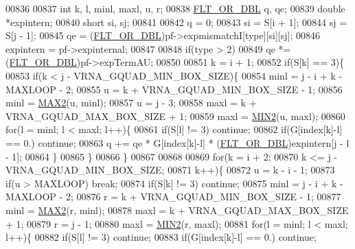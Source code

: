 \begin{DoxyCode}
00836 
00837   \textcolor{keywordtype}{int}         k, l, minl, maxl, u, r;
00838   \hyperlink{group__data__structures_ga31125aeace516926bf7f251f759b6126}{FLT\_OR\_DBL}  q, qe;
00839   \textcolor{keywordtype}{double}      *expintern;
00840   \textcolor{keywordtype}{short}       si, sj;
00841 
00842   q         = 0;
00843   si        = S[i + 1];
00844   sj        = S[j - 1];
00845   qe        = (\hyperlink{group__data__structures_ga31125aeace516926bf7f251f759b6126}{FLT\_OR\_DBL})pf->expmismatchI[type][si][sj];
00846   expintern = pf->expinternal;
00847 
00848   \textcolor{keywordflow}{if}(type > 2)
00849     qe *= (\hyperlink{group__data__structures_ga31125aeace516926bf7f251f759b6126}{FLT\_OR\_DBL})pf->expTermAU;
00850 
00851   k = i + 1;
00852   \textcolor{keywordflow}{if}(S[k] == 3)\{
00853     \textcolor{keywordflow}{if}(k < j - VRNA\_GQUAD\_MIN\_BOX\_SIZE)\{
00854       minl  = j - i + k - MAXLOOP - 2;
00855       u     = k + VRNA\_GQUAD\_MIN\_BOX\_SIZE - 1;
00856       minl  = \hyperlink{group__utils_gadd91367918fadbc8d585940d6206d6d2}{MAX2}(u, minl);
00857       u     = j - 3;
00858       maxl  = k + VRNA\_GQUAD\_MAX\_BOX\_SIZE + 1;
00859       maxl  = \hyperlink{group__utils_ga2dd4a927a7f937f43a90c144d79107d8}{MIN2}(u, maxl);
00860       \textcolor{keywordflow}{for}(l = minl; l < maxl; l++)\{
00861         \textcolor{keywordflow}{if}(S[l] != 3) \textcolor{keywordflow}{continue};
00862         \textcolor{keywordflow}{if}(G[index[k]-l] == 0.) \textcolor{keywordflow}{continue};
00863         q += qe * G[index[k]-l] * (\hyperlink{group__data__structures_ga31125aeace516926bf7f251f759b6126}{FLT\_OR\_DBL})expintern[j - l - 1];
00864       \}
00865     \}
00866   \}
00867 
00868 
00869   \textcolor{keywordflow}{for}(k = i + 2;
00870       k <= j - VRNA\_GQUAD\_MIN\_BOX\_SIZE;
00871       k++)\{
00872     u = k - i - 1;
00873     \textcolor{keywordflow}{if}(u > MAXLOOP) \textcolor{keywordflow}{break};
00874     \textcolor{keywordflow}{if}(S[k] != 3) \textcolor{keywordflow}{continue};
00875     minl  = j - i + k - MAXLOOP - 2;
00876     r     = k + VRNA\_GQUAD\_MIN\_BOX\_SIZE - 1;
00877     minl  = \hyperlink{group__utils_gadd91367918fadbc8d585940d6206d6d2}{MAX2}(r, minl);
00878     maxl  = k + VRNA\_GQUAD\_MAX\_BOX\_SIZE + 1;
00879     r     = j - 1;
00880     maxl  = \hyperlink{group__utils_ga2dd4a927a7f937f43a90c144d79107d8}{MIN2}(r, maxl);
00881     \textcolor{keywordflow}{for}(l = minl; l < maxl; l++)\{
00882       \textcolor{keywordflow}{if}(S[l] != 3) \textcolor{keywordflow}{continue};
00883       \textcolor{keywordflow}{if}(G[index[k]-l] == 0.) \textcolor{keywordflow}{continue};

\end{DoxyCode}
